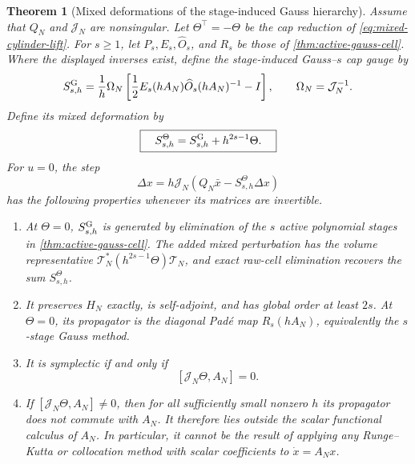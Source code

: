 \documentclass[11pt,a4paper]{article}
\newtheorem{theorem}{Theorem}[section]
\begin{document}
\begin{theorem}[Mixed deformations of the stage-induced Gauss hierarchy]
\label{thm:mixed-gauss-deformation}
Assume that \(Q_N\) and \(\mathcal J_N\) are nonsingular.  Let
\(\Theta^\top=-\Theta\) be the cap reduction of
\cref{eq:mixed-cylinder-lift}.  For \(s\ge1\), let
\(P_s,E_s,\widehat O_s\), and \(R_s\) be those of
\cref{thm:active-gauss-cell}.  Where the displayed inverses exist, define
the stage-induced Gauss--\(s\) cap gauge by
\begin{equation}\label{eq:gauss-s-cap-gauge}
 S^{\rm G}_{s,h}
 =\frac1h\Omega_N
 \left[
  \frac12E_s(hA_N)\widehat O_s(hA_N)^{-1}-I
 \right],
 \qquad \Omega_N=\mathcal J_N^{-1}.
\end{equation}
Define its mixed deformation by
\begin{equation}\label{eq:mixed-gauss-gauge}
 \boxed{\quad
 S_{s,h}^{\Theta}=S^{\rm G}_{s,h}+h^{2s-1}\Theta.
 \quad}
\end{equation}
For \(u=0\), the step
\begin{equation}\label{eq:mixed-gauss-step}
 \Delta x
 =h\mathcal J_N
 \left(Q_N\bar x-S_{s,h}^{\Theta}\Delta x\right)
\end{equation}
has the following properties whenever its matrices are invertible.
\begin{enumerate}
 \item At \(\Theta=0\), \(S^{\rm G}_{s,h}\) is generated by elimination
 of the \(s\) active polynomial stages in
 \cref{thm:active-gauss-cell}.  The added mixed perturbation has the
 volume representative
 \(\mathcal T_N^*(h^{2s-1}\Theta)\mathcal T_N\), and exact raw-cell
 elimination recovers the sum \(S_{s,h}^{\Theta}\).
 \item It preserves \(H_N\) exactly, is self-adjoint, and has global order
 at least \(2s\).  At \(\Theta=0\), its
 propagator is the diagonal Pad\'e map \(R_s(hA_N)\), equivalently the
 \(s\)-stage Gauss method.
 \item It is symplectic if and only if
 \begin{equation}\label{eq:mixed-gauss-symplectic}
  [\mathcal J_N\Theta,A_N]=0.
 \end{equation}
 \item If \([\mathcal J_N\Theta,A_N]\ne0\), then for all sufficiently
 small nonzero \(h\) its propagator does not commute with \(A_N\).  It
 therefore lies outside the scalar functional calculus of \(A_N\).  In
 particular, it cannot be the result of applying any Runge--Kutta or
 collocation method with scalar coefficients to \(\dot x=A_Nx\).
\end{enumerate}
\end{theorem}
\end{document}
